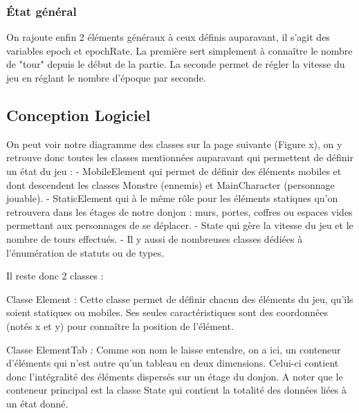 \documentclass[a4paper,12pt]{article}
\begin{document}
\subsubsection{État général}

On rajoute enfin 2 éléments généraux à ceux définis auparavant, il s'agit des variables epoch et epochRate.
La première sert simplement à connaître le nombre de "tour" depuis le début de la partie. 
La seconde permet de régler la vitesse du jeu en réglant le nombre d'époque par seconde.

\subsection{Conception Logiciel}

On peut voir notre diagramme des classes sur la page suivante (Figure x), on y retrouve donc toutes les classes mentionnées auparavant qui permettent de définir un état du jeu :
- MobileElement qui permet de définir des éléments mobiles et dont descendent les classes Monstre (ennemis) et MainCharacter (personnage jouable).
- StaticElement qui à le même rôle pour les éléments statiques qu'on retrouvera dans les étages de notre donjon : murs, portes, coffres ou espaces vides permettant aux personnages de se déplacer.
- State qui gère la vitesse du jeu et le nombre de tours effectués.
- Il y aussi de nombreuses classes dédiées à l'énumération de statuts ou de types.

Il reste donc 2 classes : 

Classe Element : Cette classe permet de définir chacun des éléments du jeu, qu'ils soient statiques ou mobiles. Ses seules caractéristiques sont des coordonnées (notés x et y) pour connaître la position de l'élément.

Classe ElementTab :  Comme son nom le laisse entendre, on a ici, un conteneur d'éléments qui n'est autre qu'un tableau en deux dimensions. Celui-ci contient donc l'intégralité des éléments dispersés sur un étage du donjon.
A noter que le conteneur principal est la classe State qui contient la totalité des données liées à un état donné.
\end{document}
